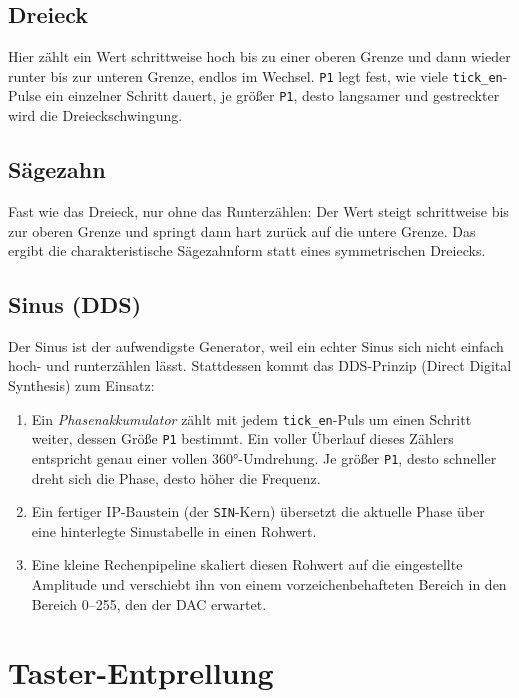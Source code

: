 \subsection{Dreieck}

Hier zählt ein Wert schrittweise hoch bis zu einer oberen Grenze und dann wieder runter bis zur unteren Grenze, endlos im Wechsel. \texttt{P1} legt fest, wie viele \texttt{tick\_en}-Pulse ein einzelner Schritt dauert, je größer \texttt{P1}, desto langsamer und \glqq gestreckter\grqq{} wird die Dreieckschwingung.

\subsection{Sägezahn}

Fast wie das Dreieck, nur ohne das Runterzählen: Der Wert steigt schrittweise bis zur oberen Grenze und springt dann hart zurück auf die untere Grenze. Das ergibt die charakteristische Sägezahnform statt eines symmetrischen Dreiecks.

\subsection{Sinus (DDS)}

Der Sinus ist der aufwendigste Generator, weil ein echter Sinus sich nicht einfach hoch- und runterzählen lässt. Stattdessen kommt das DDS-Prinzip (Direct Digital Synthesis) zum Einsatz:

\begin{enumerate}
    \item Ein \emph{Phasenakkumulator} zählt mit jedem \texttt{tick\_en}-Puls um einen Schritt weiter, dessen Größe \texttt{P1} bestimmt. Ein voller Überlauf dieses Zählers entspricht genau einer vollen 360°-Umdrehung. Je größer \texttt{P1}, desto schneller dreht sich die Phase, desto höher die Frequenz.
    \item Ein fertiger IP-Baustein (der \texttt{SIN}-Kern) übersetzt die aktuelle Phase über eine hinterlegte Sinustabelle in einen Rohwert.
    \item Eine kleine Rechenpipeline skaliert diesen Rohwert auf die eingestellte Amplitude und verschiebt ihn von einem vorzeichenbehafteten Bereich in den Bereich 0--255, den der DAC erwartet.
\end{enumerate}

\section{Taster-Entprellung}

